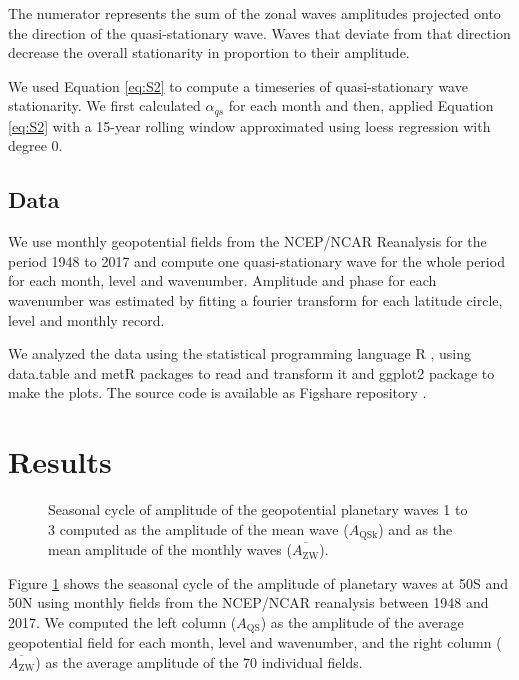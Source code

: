 \documentclass[draft,linenumbers]{agujournal2018}
\begin{document}
The numerator represents the sum of the zonal waves amplitudes projected
onto the direction of the quasi-stationary wave. Waves that deviate from
that direction decrease the overall stationarity in proportion to their
amplitude.

We used Equation \ref{eq:S2} to compute a timeseries of quasi-stationary
wave stationarity. We first calculated \(\alpha_{qs}\) for each month
and then, applied Equation \ref{eq:S2} with a 15-year rolling window
approximated using loess regression with degree 0.

\subsection{Data}

We use monthly geopotential fields from the NCEP/NCAR Reanalysis
\citep{Kalnay1996} for the period 1948 to 2017 and compute one
quasi-stationary wave for the whole period for each month, level and
wavenumber. Amplitude and phase for each wavenumber was estimated by
fitting a fourier transform for each latitude circle, level and monthly
record.

We analyzed the data using the statistical programming language R
\citep{R-base}, using data.table and metR packages
\citep{R-data.table, R-metR} to read and transform it and ggplot2
package \citep{R-ggplot2} to make the plots. The source code is
available as Figshare repository \citep{Campitelli2019-figshare}.

\section{Results}

\begin{figure}[h]

{\centering {}\newline{}

}

\caption{Seasonal cycle of amplitude of the geopotential planetary waves 1 to 3 computed as the amplitude of the mean wave ($A_\mathrm{QSk}$) and as the mean amplitude of the monthly waves ($\overline{A_\mathrm{ZW} }$).}\label{fig:rao}
\end{figure}

Figure \ref{fig:rao} shows the seasonal cycle of the amplitude of
planetary waves at 50\degree S and 50\degree N using monthly fields from
the NCEP/NCAR reanalysis \citep{Kalnay1996} between 1948 and 2017. We
computed the left column (\(A_\mathrm{QS}\)) as the amplitude of the
average geopotential field for each month, level and wavenumber, and the
right column (\(\overline{A_\mathrm{ZW}}\)) as the average amplitude of
the 70 individual fields.
\end{document}
